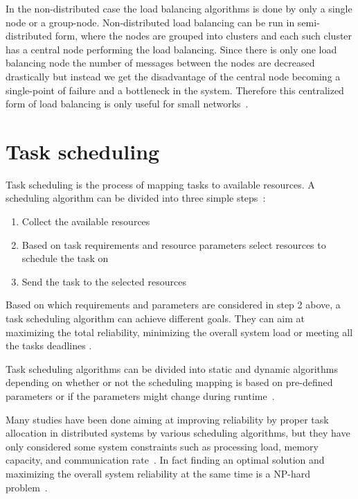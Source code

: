 \documentclass{cslthse-msc}
\begin{document}
In the non-distributed case the load balancing algorithms is done by only a single node or a group-node. Non-distributed load balancing can be run in semi-distributed form, where the nodes are grouped into clusters and each such cluster has a central node performing the load balancing. Since there is only one load balancing node the number of messages between the nodes are decreased drastically but instead we get the disadvantage of the central node becoming a single-point of failure and a bottleneck in the system. Therefore this centralized form of load balancing is only useful for small networks~\cite{perfAnalysisLoadCloud}.
\fi

\section{Task scheduling} \label{sec:background_task_sched}
Task scheduling is the process of mapping tasks to available resources. A scheduling algorithm can be divided into three simple steps~\cite{optSchedCloud}:

\begin{enumerate}
	\item Collect the available resources
	\item Based on task requirements and resource parameters select resources to schedule the task on
	\item Send the task to the selected resources
\end{enumerate}

Based on which requirements and parameters are considered in step 2 above, a task scheduling algorithm can achieve different goals. They can aim at maximizing the total reliability, minimizing the overall system load or meeting all the tasks deadlines \cite{schedulingSurvey}. 

Task scheduling algorithms can be divided into static and dynamic algorithms depending on whether or not the scheduling mapping is based on pre-defined parameters or if the parameters might change during runtime~\cite{schedReplicas}.

Many studies have been done aiming at improving reliability by proper task allocation in distributed systems by various scheduling algorithms, but they have only considered some system constraints such as processing load, memory capacity, and communication rate~\cite{optTaskAllocationForMaxRel}. In fact finding an optimal solution and maximizing the overall system reliability at the same time is a NP-hard problem~\cite{optTaskAllocationForMaxRel, taskAllocationSwarm, schedulingSurvey}.
\end{document}
